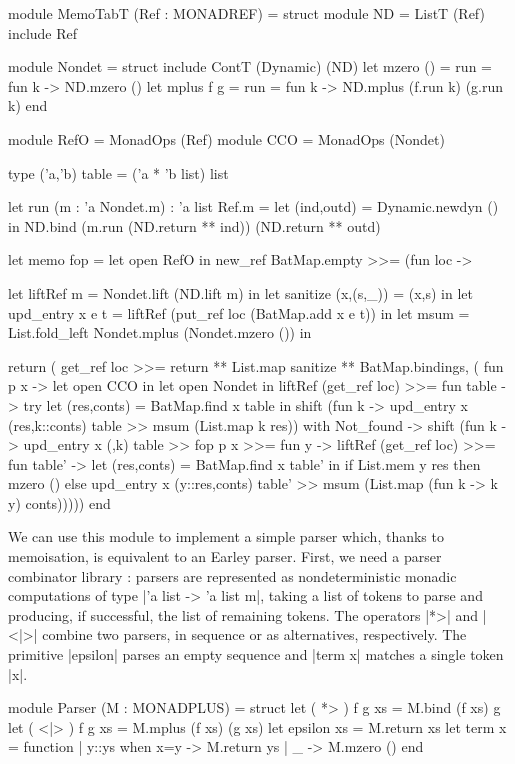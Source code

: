 \begin{ocaml}
	module MemoTabT (Ref : MONADREF) = struct
		module ND = ListT (Ref)
		include Ref

		module Nondet = struct
			include ContT (Dynamic) (ND)
			let mzero ()  = {{run = fun k -> ND.mzero ()}}
			let mplus f g = {{run = fun k -> ND.mplus (f.run k) (g.run k)}}
		end

		module RefO = MonadOps (Ref)
		module CCO = MonadOps (Nondet)

		type ('a,'b) table = ('a * 'b list) list

		let run (m : 'a Nondet.m) : 'a list Ref.m =
			let (ind,outd) = Dynamic.newdyn () in
			ND.bind (m.run (ND.return ** ind)) (ND.return ** outd)

		let memo fop = let open RefO in 
			new_ref BatMap.empty >>= (fun loc ->

			let liftRef m  = Nondet.lift (ND.lift m) in
			let sanitize (x,(s,_)) = (x,s) in
			let upd_entry x e t = liftRef (put_ref loc (BatMap.add x e t)) in
			let msum = List.fold_left Nondet.mplus (Nondet.mzero ()) in

			return (
				get_ref loc >>= return ** List.map sanitize ** BatMap.bindings, 
				( fun p x -> let open CCO in let open Nondet in
						liftRef (get_ref loc) >>= fun table ->
						try let (res,conts) = BatMap.find x table in
							shift (fun k -> upd_entry x (res,k::conts) table >>
															msum (List.map k res))
						with Not_found ->
							shift (fun k -> upd_entry x ({},{k}) table >>
															fop p x >>= fun y ->
															liftRef (get_ref loc) >>= fun table' ->
															let (res,conts) = BatMap.find x table' in
															if List.mem y res then mzero ()
															else upd_entry x (y::res,conts) table' >>
																	 msum (List.map (fun k -> k y) conts)))))
	end
\end{ocaml}
\vspace{0.5em}
We can use this module to implement a simple parser which, thanks to
memoisation, is equivalent to an Earley parser. First, we need a parser
combinator library \cite{Hutton1990}: parsers are represented as nondeterministic
monadic computations of type |'a list -> 'a list m|, taking a list of tokens to 
parse and producing, if successful, the list of remaining tokens. The operators 
|*>| and |<|>| combine two parsers, in sequence or as alternatives, respectively.
The primitive |epsilon| parses an empty sequence and |term x| matches a single token
|x|.
\vspace{0.5em}
\begin{ocaml}
	module Parser (M : MONADPLUS) = struct
		let ( *> ) f g xs = M.bind (f xs) g
		let ( <|> ) f g xs = M.mplus (f xs) (g xs)
		let epsilon xs = M.return xs
		let term x = function | y::ys when x=y -> M.return ys
                           | _ -> M.mzero ()
	end
\end{ocaml}
